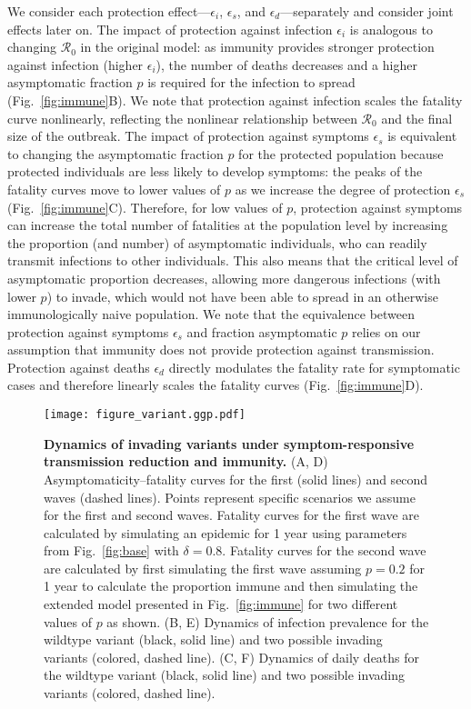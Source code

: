 \documentclass[12pt]{article}
\newcommand{\fref}[1]{Fig.~\ref{fig:#1}}
\newcommand{\RR}{\ensuremath{{\mathcal R}}\xspace}
\begin{document}
We consider each protection effect---$\epsilon_i$, $\epsilon_s$, and $\epsilon_d$---separately and consider joint effects later on.
The impact of protection against infection $\epsilon_i$ is analogous to changing $\RR_0$ in the original model: as immunity provides stronger protection against infection (higher $\epsilon_i$), the number of deaths decreases and a higher asymptomatic fraction $p$ is required for the infection to spread (\fref{immune}B).
We note that protection against infection scales the fatality curve nonlinearly, reflecting the nonlinear relationship between $\RR_0$ and the final size of the outbreak.
The impact of protection against symptoms $\epsilon_s$ is equivalent to changing the asymptomatic fraction $p$ for the protected population because protected individuals are less likely to develop symptoms:
the peaks of the fatality curves move to lower values of $p$ as we increase the degree of protection $\epsilon_s$ (\fref{immune}C).
Therefore, for low values of $p$, protection against symptoms can increase the total number of fatalities at the population level by increasing the proportion (and number) of asymptomatic individuals, who can readily transmit infections to other individuals.
This also means that the critical level of asymptomatic proportion decreases, allowing more dangerous infections (with lower $p$) to invade, which would not have been able to spread in an otherwise immunologically naive population.
We note that the equivalence between protection against symptoms $\epsilon_s$ and fraction asymptomatic $p$ relies on our assumption that immunity does not provide protection against transmission.
Protection against deaths $\epsilon_d$ directly modulates the fatality rate for symptomatic cases and therefore linearly scales the fatality curves (\fref{immune}D).

\begin{figure}[!ht]
\texttt{[image: figure\_variant.ggp.pdf]}
\caption{
\textbf{Dynamics of invading variants under symptom-responsive transmission reduction and immunity.}
(A, D) Asymptomaticity--fatality curves for the first (solid lines) and second waves (dashed lines).
Points represent specific scenarios we assume for the first and second waves.
Fatality curves for the first wave are calculated by simulating an epidemic for 1 year using parameters from \fref{base} with $\delta=0.8$.
Fatality curves for the second wave are calculated by first simulating the first wave assuming $p=0.2$ for 1 year to calculate the proportion immune and then simulating the extended model presented in \fref{immune} for two different values of $p$ as shown.
(B, E) Dynamics of infection prevalence for the wildtype variant (black, solid line) and two possible invading variants (colored, dashed line).
(C, F) Dynamics of daily deaths for the wildtype variant (black, solid line) and two possible invading variants (colored, dashed line).
}
\label{fig:variant}
\end{figure}
\end{document}
